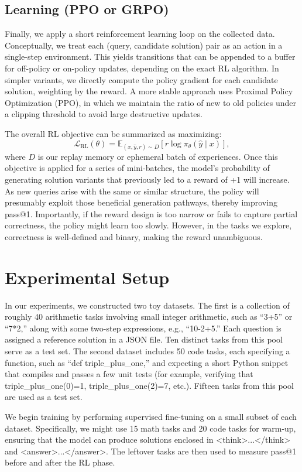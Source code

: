 \documentclass{article}
\begin{document}
\subsection{Learning (PPO or GRPO)}
Finally, we apply a short reinforcement learning loop on the collected data. Conceptually, we treat each (query, candidate solution) pair as an action in a single-step environment. This yields transitions that can be appended to a buffer for off-policy or on-policy updates, depending on the exact RL algorithm. In simpler variants, we directly compute the policy gradient for each candidate solution, weighting by the reward. A more stable approach uses Proximal Policy Optimization (PPO), in which we maintain the ratio of new to old policies under a clipping threshold to avoid large destructive updates.

The overall RL objective can be summarized as maximizing:
\[
\mathcal{L}_{\text{RL}}(\theta) = \mathbb{E}_{(x, \hat{y}, r)\sim D}\left[r \log \pi_\theta(\hat{y}\mid x)\right],
\]
where \(D\) is our replay memory or ephemeral batch of experiences. Once this objective is applied for a series of mini-batches, the model’s probability of generating solution variants that previously led to a reward of +1 will increase. As new queries arise with the same or similar structure, the policy will presumably exploit those beneficial generation pathways, thereby improving pass@1. Importantly, if the reward design is too narrow or fails to capture partial correctness, the policy might learn too slowly. However, in the tasks we explore, correctness is well-defined and binary, making the reward unambiguous. 

\section{Experimental Setup}
In our experiments, we constructed two toy datasets. The first is a collection of roughly 40 arithmetic tasks involving small integer arithmetic, such as “3+5” or “7*2,” along with some two-step expressions, e.g., “10-2+5.” Each question is assigned a reference solution in a JSON file. Ten distinct tasks from this pool serve as a test set. The second dataset includes 50 code tasks, each specifying a function, such as “def triple_plus_one,” and expecting a short Python snippet that compiles and passes a few unit tests (for example, verifying that triple_plus_one(0)=1, triple_plus_one(2)=7, etc.). Fifteen tasks from this pool are used as a test set.

We begin training by performing supervised fine-tuning on a small subset of each dataset. Specifically, we might use 15 math tasks and 20 code tasks for warm-up, ensuring that the model can produce solutions enclosed in <think>...</think> and <answer>...</answer>. The leftover tasks are then used to measure pass@1 before and after the RL phase.
\end{document}
